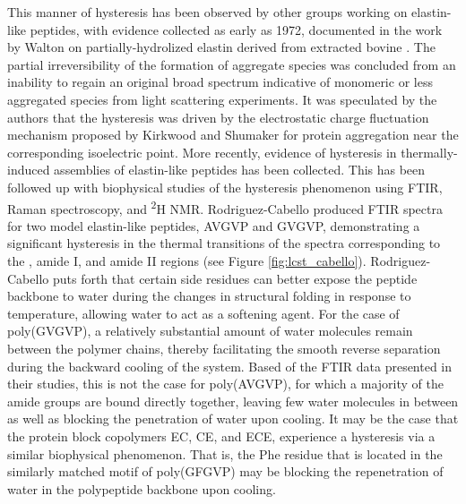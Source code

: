 \begin{refsection}
This manner of hysteresis has been observed by other groups working on
elastin-like peptides, with evidence collected as early as 1972, documented in
the work by Walton on partially-hydrolized elastin derived from extracted bovine
.\cite{Jamieson1972a} The partial irreversibility of
the formation of aggregate species was concluded from an inability to regain an
original broad spectrum indicative of monomeric or less aggregated species from
light scattering experiments. It was speculated by the authors that the
hysteresis was driven by the electrostatic charge fluctuation mechanism proposed
by Kirkwood and Shumaker\cite{Kirkwood1952} for protein aggregation near the
corresponding isoelectric point. More recently, evidence of hysteresis in
thermally-induced assemblies of elastin-like peptides has been
collected.\cite{Osborne2008,Herrero-Vanrell2005} This has been followed up with
biophysical studies of the hysteresis phenomenon using FTIR, Raman spectroscopy,
and \textsuperscript{2}H NMR.\cite{Schmidt2005,Ma2012b} Rodriguez-Cabello
produced FTIR spectra for two model elastin-like peptides, AVGVP and GVGVP,
demonstrating a significant hysteresis in the thermal transitions of the spectra
corresponding to the , amide I, and amide II regions (see Figure
\ref{fig:lcst_cabello}).\cite{Schmidt2005} Rodriguez-Cabello puts forth that
certain side residues can better expose the peptide backbone to water during the
changes in structural folding in response to temperature, allowing water to act
as a softening agent.  For the case of poly(GVGVP), a relatively substantial
amount of water molecules remain between the polymer chains, thereby
facilitating the smooth reverse separation during the backward cooling of the
system. Based of the FTIR data presented in their studies, this is not the case
for poly(AVGVP), for which a majority of the amide groups are bound directly
together, leaving few water molecules in between as well as blocking the
penetration of water upon cooling.  It may be the case that the protein block
copolymers EC, CE, and ECE, experience a hysteresis via a similar biophysical
phenomenon. That is, the Phe residue that is located in the similarly matched
motif of poly(GFGVP) may be blocking the repenetration of water in the
polypeptide backbone upon cooling. 


\end{refsection}
